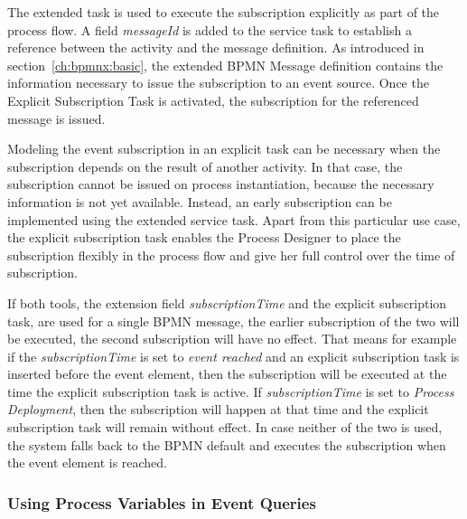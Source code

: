 

The extended task is used to execute the subscription explicitly as part of the process flow.
A field \textit{messageId} is added to the service task to establish a reference between the activity and the message definition.
As introduced in section~\autoref{ch:bpmnx:basic}, the extended BPMN Message definition contains the information necessary to issue the subscription to an event source.
Once the Explicit Subscription Task is activated, the subscription for the referenced message is issued. 

Modeling the event subscription in an explicit task can be necessary when the subscription depends on the result of another activity. In that case, the subscription cannot be issued on process instantiation, because the necessary information is not yet available. Instead, an early subscription can be implemented using the extended service task.
Apart from this particular use case, the explicit subscription task enables the Process Designer to place the subscription flexibly in the process flow and give her full control over the time of subscription.


If both tools, the extension field \textit{subscriptionTime} and the explicit subscription task, are used for a single BPMN message, the earlier subscription of the two will be executed, the second subscription will have no effect.
That means for example if the \textit{subscriptionTime} is set to \textit{event reached} and an explicit subscription task is inserted before the event element, then the subscription will be executed at the time the explicit subscription task is active.
If \textit{subscriptionTime} is set to \textit{Process Deployment}, then the subscription will happen at that time and the explicit subscription task will remain without effect.
In case neither of the two is used, the system falls back to the BPMN default and executes the subscription when the event element is reached.

\subsubsection{Using Process Variables in Event Queries}


